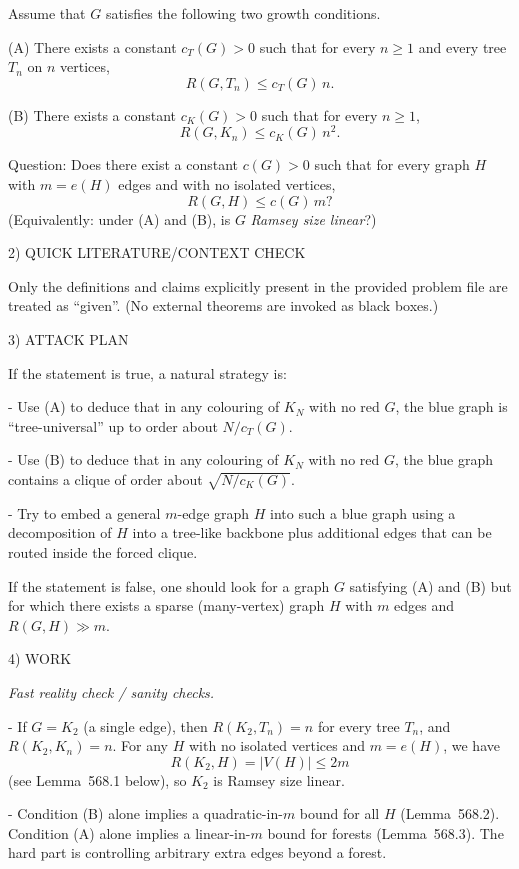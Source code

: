 Assume that $G$ satisfies the following two growth conditions.

(A) There exists a constant $c_T(G)>0$ such that for every $n\ge 1$ and every tree $T_n$ on $n$ vertices,
\[
R(G,T_n) \le c_T(G)\,n.
\]

(B) There exists a constant $c_K(G)>0$ such that for every $n\ge 1$,
\[
R(G,K_n) \le c_K(G)\,n^2.
\]

Question: Does there exist a constant $c(G)>0$ such that for every graph $H$ with $m=e(H)$ edges and with no isolated vertices,
\[
R(G,H) \le c(G)\,m?
\]
(Equivalently: under (A) and (B), is $G$ \emph{Ramsey size linear}?)

2) QUICK LITERATURE/CONTEXT CHECK

Only the definitions and claims explicitly present in the provided problem file are treated as ``given''. (No external theorems are invoked as black boxes.)

3) ATTACK PLAN

If the statement is true, a natural strategy is:

- Use (A) to deduce that in any colouring of $K_N$ with no red $G$, the blue graph is ``tree-universal'' up to order about $N/c_T(G)$.

- Use (B) to deduce that in any colouring of $K_N$ with no red $G$, the blue graph contains a clique of order about $\sqrt{N/c_K(G)}$.

- Try to embed a general $m$-edge graph $H$ into such a blue graph using a decomposition of $H$ into a tree-like backbone plus additional edges that can be routed inside the forced clique.

If the statement is false, one should look for a graph $G$ satisfying (A) and (B) but for which there exists a sparse (many-vertex) graph $H$ with $m$ edges and $R(G,H)\gg m$.

4) WORK

\emph{Fast reality check / sanity checks.}

- If $G=K_2$ (a single edge), then $R(K_2,T_n)=n$ for every tree $T_n$, and $R(K_2,K_n)=n$. For any $H$ with no isolated vertices and $m=e(H)$, we have
\[
R(K_2,H)=|V(H)|\le 2m
\]
(see Lemma~568.1 below), so $K_2$ is Ramsey size linear.

- Condition (B) alone implies a quadratic-in-$m$ bound for all $H$ (Lemma~568.2). Condition (A) alone implies a linear-in-$m$ bound for forests (Lemma~568.3). The hard part is controlling arbitrary extra edges beyond a forest.

\medskip


